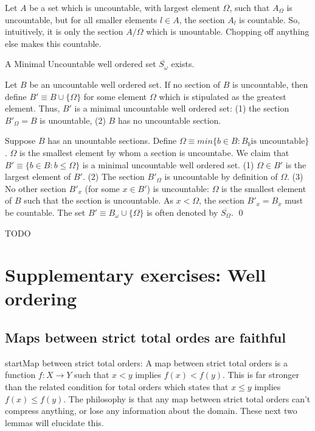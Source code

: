 \documentclass{article}
\begin{document}
Let $A$ be a set which is uncountable, with largest element $\Omega$, such that $A_\Omega$ is uncountable, but for all smaller elements $l \in A$, the section $A_l$ is countable.
So, intuitively, it is only the section $A/\Omega$ which is unountable. Chopping off anything else makes this countable.


 A Minimal Uncountable well ordered set $\overline{S_\omega}$ exists.

\proof{} Let $B$ be an uncountable well ordered set. If no section of $B$ is uncountable, then define $B' \equiv B \cup \{ \Omega \}$ for some element $\Omega$ which is
stipulated as the greatest element. Thus, $B'$ is a minimal uncountable well ordered set: (1) the section $B'_\Omega = B$ is unountable, (2) $B$ has no uncountable section.

Suppose $B$ has an unountable sections. Define $\Omega \equiv min \{ b \in B : B_b \text{is uncountable} \}$. $\Omega$ is the
smallest element by whom a section is uncountabe. We claim that $B' \equiv \{ b \in B: b \leq \Omega \}$ is a minimal uncountable well ordered set.
(1) $\Omega \in B'$ is the largest element of $B'$. (2) The section $B'_\Omega$ is uncountable by definition of $\Omega.$ (3) No other section $B'_x$ (for some $x \in B'$) is
uncountable: $\Omega$ is the smallest element of $B$ such that the section is uncountable. As $x < \Omega$, the section $B'_x = B_x$ must be countable.
The set $B' \equiv B_\omega \cup \{ \Omega \}$ is often denoted by $\overline{S_\Omega}$. \qed


TODO

\section{Supplementary exercises: Well ordering}


\subsection{Maps between strict total ordes are faithful}


start{Map between strict total orders:} A map between strict total orders is a function $f: X \rightarrow Y$
such that $x < y$ implies $f(x) < f(y)$. This is far stronger than the related condition for total orders
which states that $x \leq y$ implies $f(x) \leq f(y)$.  The philosophy is that
any map between strict total orders can't compress anything, or lose any
information about the domain. These next two lemmas will elucidate this.
\end{document}
